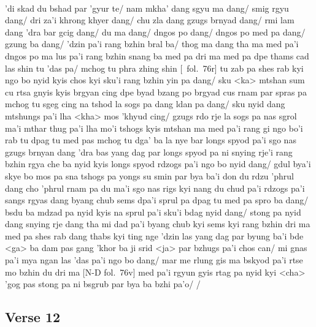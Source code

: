 \documentclass[12pt]{article}
\begin{document}
\textbf{\TVB}\\
'di skad du bshad par 'gyur te/ nam mkha' dang sgyu ma dang/ smig rgyu dang/ dri za'i khrong khyer dang/ chu zla dang gzugs brnyad dang/ rmi lam dang 'dra bar gcig dang/ du ma dang/ dngos po dang/ dngos po med pa dang/ gzung ba dang/ 'dzin pa'i rang bzhin bral ba/ thog ma dang tha ma med pa'i dngos po ma lus pa'i rang bzhin snang ba med pa dri ma med pa dpe thams cad las shin tu 'das pa/ mchog tu phra zhing shin [\TVB\ fol.\ 76r] tu zab pa shes rab kyi ngo bo nyid kyis chos kyi sku'i rang bzhin yin pa dang/ sku <ka> mtshan sum cu rtsa gnyis kyis brgyan cing dpe byad bzang po brgyad cus rnam par spras pa mchog tu sgeg cing na tshod la sogs pa dang ldan pa dang/ sku nyid dang mtshungs pa'i lha <kha> mos 'khyud cing/ gzugs rdo rje la sogs pa nas sgrol ma'i mthar thug pa'i lha mo'i tshogs kyis mtshan ma med pa'i rang gi ngo bo'i rab tu dpag tu med pas mchog tu dga' ba la nye bar longs spyod pa'i sgo nas gzugs brnyan dang 'dra bas yang dag par longs spyod pa ni snying rje'i rang bzhin rgya che ba nyid kyis longs spyod rdzogs pa'i ngo bo nyid dang/ gdul bya'i skye bo mos pa sna tshogs pa yongs su smin par bya ba'i don du rdzu 'phrul dang cho 'phrul rnam pa du ma'i sgo nas rigs kyi nang du chud pa'i rdzogs pa'i sangs rgyas dang byang chub sems dpa'i sprul pa dpag tu med pa spro ba dang/ bsdu ba mdzad pa nyid kyis na sprul pa'i sku'i bdag nyid dang/ stong pa nyid dang snying rje dang tha mi dad pa'i byang chub kyi sems kyi rang bzhin dri ma med pa shes rab dang thabs kyi ting nge 'dzin las yang dag par byung ba'i bde <ga> ba dam pas gang 'khor ba ji srid <ja> par bzhugs pa'i chos can/ mi gnas pa'i mya ngan las 'das pa'i ngo bo dang/ mar me rlung gis ma bskyod pa'i rtse mo bzhin du dri ma [N-D fol.\ 76v] med pa'i rgyun gyis rtag pa nyid kyi <cha> 'gog pas stong pa ni bsgrub par bya ba bzhi pa'o/ /

\subsection{Verse 12}
\end{document}
